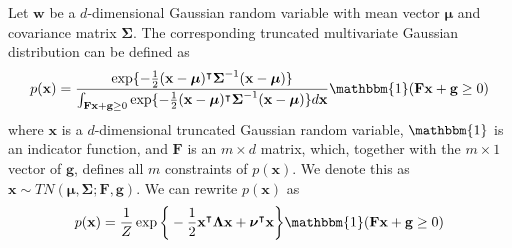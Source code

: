\documentclass{scrartcl}
\numberwithin{equation}{section}
\begin{document}
Let $\textbf{w}$ be a $d$-dimensional Gaussian random variable with mean vector $\boldsymbol{\mu}$ and covariance matrix $\boldsymbol{\Sigma}$. The corresponding truncated multivariate Gaussian distribution can be defined as
\begin{equation}\label{tmg}
	p(\boldsymbol{\textbf{x}}) = \frac{\exp\{-\frac{1}{2}(\textbf{x}-\boldsymbol{\mu})^{\intercal} \boldsymbol{\Sigma}^{-1}(\textbf{x}-\boldsymbol{\mu})\}}{\int_{\textbf{F}\textbf{x} + \textbf{g} \geq 0} \exp\{-\frac{1}{2}(\textbf{x}-\boldsymbol{\mu})^{\intercal} \boldsymbol{\Sigma}^{-1}(\textbf{x}-\boldsymbol{\mu})\} d\textbf{x}}\mathbbm{1}(\textbf{F}\textbf{x} + \textbf{g} \geq 0)
\end{equation}
where $\textbf{x}$ is a $d$-dimensional truncated Gaussian random variable, $\mathbbm{1}$ is an indicator function, and $\textbf{F}$ is an $m \times d$ matrix, which, together with the $m \times 1$ vector of $\textbf{g}$, defines all $m$ constraints of $p(\boldsymbol{\textbf{x}})$.  We denote this as $\textbf{x} \sim TN(\boldsymbol{\mu}, \boldsymbol{\Sigma};\textbf{F},\textbf{g})$. We can rewrite $p(\boldsymbol{\textbf{x}})$ as
\begin{equation}\label{tmg2}
	p(\textbf{x}) = \frac1Z\exp\bigg\{-\frac{1}{2}\textbf{x}^{\intercal} \boldsymbol{\Lambda} \textbf{x} + \boldsymbol{\nu}^{\intercal}\textbf{x}\bigg\}\mathbbm{1}(\textbf{F}\textbf{x} + \textbf{g} \geq 0)
\end{equation}


\end{document}
